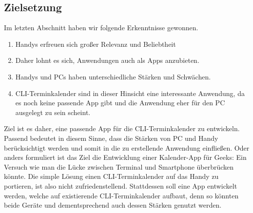 \subsection{Zielsetzung}\label{section:zielsetzung}

Im letzten Abschnitt haben wir folgende Erkenntnisse gewonnen.
\begin{enumerate}
	\item Handys erfreuen sich großer Relevanz und Beliebtheit
	\item Daher lohnt es sich, Anwendungen auch als Apps anzubieten.
	\item Handys und PCs haben unterschiedliche Stärken und Schwächen.
	\item CLI-Terminkalender sind in dieser Hinsicht eine interessante Anwendung, da es noch keine passende App gibt und die Anwendung eher für den PC ausgelegt zu sein scheint.
\end{enumerate}

\myNewSection
Ziel ist es daher, eine passende App für die CLI-Terminkalender zu entwickeln. \glqq Passend\grqq{} bedeutet in diesem Sinne, dass die Stärken von PC und Handy berücksichtigt werden und somit in die zu erstellende Anwendung einfließen.\newline%
Oder anders formuliert ist das Ziel die \glqq Entwicklung einer Kalender-App für Geeks: Ein Versuch wie man die Lücke zwischen Terminal und Smartphone überbrücken könnte\grqq{}.\newline%
Die simple Lösung einen CLI-Terminkalender auf das Handy zu portieren, ist also nicht zufriedenstellend. Stattdessen soll eine App entwickelt werden, welche auf existierende CLI-Terminkalender aufbaut, denn so könnten beide Geräte und dementsprechend auch dessen Stärken genutzt werden.

